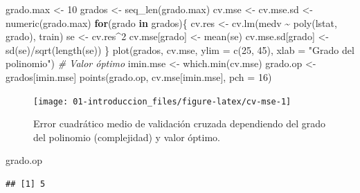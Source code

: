 \documentclass[
]{book}
\newenvironment{Shaded}{\begin{snugshade}}{\end{snugshade}}
\newcommand{\AttributeTok}[1]{\textcolor[rgb]{0.77,0.63,0.00}{#1}}
\newcommand{\CommentTok}[1]{\textcolor[rgb]{0.56,0.35,0.01}{\textit{#1}}}
\newcommand{\ControlFlowTok}[1]{\textcolor[rgb]{0.13,0.29,0.53}{\textbf{#1}}}
\newcommand{\DecValTok}[1]{\textcolor[rgb]{0.00,0.00,0.81}{#1}}
\newcommand{\FunctionTok}[1]{\textcolor[rgb]{0.00,0.00,0.00}{#1}}
\newcommand{\NormalTok}[1]{#1}
\newcommand{\OtherTok}[1]{\textcolor[rgb]{0.56,0.35,0.01}{#1}}
\newcommand{\SpecialCharTok}[1]{\textcolor[rgb]{0.00,0.00,0.00}{#1}}
\newcommand{\StringTok}[1]{\textcolor[rgb]{0.31,0.60,0.02}{#1}}
\theoremstyle{break}
\theoremstyle{definition}
\theoremstyle{definition}
\theoremstyle{definition}
\theoremstyle{definition}
\theoremstyle{remark}
\begin{document}
\begin{Shaded}
\begin{Highlighting}[]
\NormalTok{grado.max }\OtherTok{\textless{}{-}} \DecValTok{10}
\NormalTok{grados }\OtherTok{\textless{}{-}} \FunctionTok{seq\_len}\NormalTok{(grado.max) }
\NormalTok{cv.mse }\OtherTok{\textless{}{-}}\NormalTok{ cv.mse.sd }\OtherTok{\textless{}{-}} \FunctionTok{numeric}\NormalTok{(grado.max)}
\ControlFlowTok{for}\NormalTok{(grado }\ControlFlowTok{in}\NormalTok{ grados)\{}
\NormalTok{  cv.res }\OtherTok{\textless{}{-}} \FunctionTok{cv.lm}\NormalTok{(medv }\SpecialCharTok{\textasciitilde{}} \FunctionTok{poly}\NormalTok{(lstat, grado), train)}
\NormalTok{  se }\OtherTok{\textless{}{-}}\NormalTok{ cv.res}\SpecialCharTok{\^{}}\DecValTok{2}
\NormalTok{  cv.mse[grado] }\OtherTok{\textless{}{-}} \FunctionTok{mean}\NormalTok{(se)}
\NormalTok{  cv.mse.sd[grado] }\OtherTok{\textless{}{-}} \FunctionTok{sd}\NormalTok{(se)}\SpecialCharTok{/}\FunctionTok{sqrt}\NormalTok{(}\FunctionTok{length}\NormalTok{(se))}
\NormalTok{\}}
\FunctionTok{plot}\NormalTok{(grados, cv.mse, }\AttributeTok{ylim =} \FunctionTok{c}\NormalTok{(}\DecValTok{25}\NormalTok{, }\DecValTok{45}\NormalTok{),}
  \AttributeTok{xlab =} \StringTok{"Grado del polinomio"}\NormalTok{)}
\CommentTok{\# Valor óptimo}
\NormalTok{imin.mse }\OtherTok{\textless{}{-}} \FunctionTok{which.min}\NormalTok{(cv.mse)}
\NormalTok{grado.op }\OtherTok{\textless{}{-}}\NormalTok{ grados[imin.mse]}
\FunctionTok{points}\NormalTok{(grado.op, cv.mse[imin.mse], }\AttributeTok{pch =} \DecValTok{16}\NormalTok{)}
\end{Highlighting}
\end{Shaded}

\begin{figure}[!htb]

{\centering \texttt{[image: 01-introduccion\_files/figure-latex/cv-mse-1]} 

}

\caption{Error cuadrático medio de validación cruzada dependiendo del grado del polinomio (complejidad) y valor óptimo.}\label{fig:cv-mse}
\end{figure}

\begin{Shaded}
\begin{Highlighting}[]
\NormalTok{grado.op}
\end{Highlighting}
\end{Shaded}

\begin{verbatim}
## [1] 5
\end{verbatim}
\end{document}
